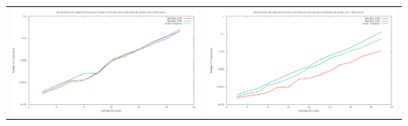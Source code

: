 \bc
\begin{tabular}{l c}
\includegraphics[scale=0.16]{finales/rendimientoExactoSinPoda2Particiones.png}
&
\includegraphics[scale=0.16]{finales/rendimientoExactoConPoda2Particiones.png}
\end{tabular}
\ec

